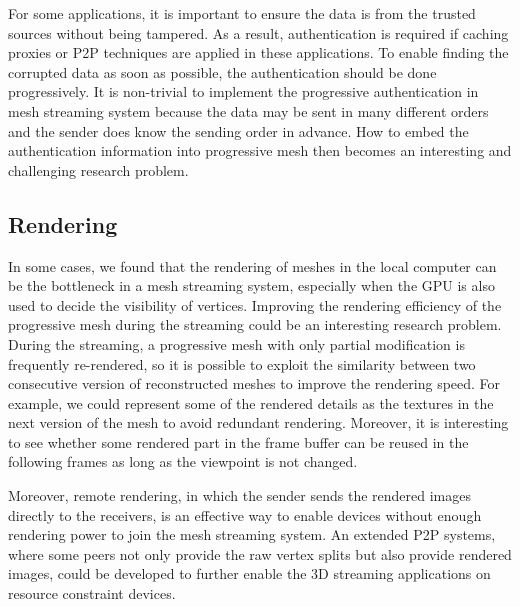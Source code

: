 For some applications, it is important to ensure the data is from the trusted sources without
being tampered. As a result, authentication is required if caching proxies or P2P techniques
are applied in these applications. 
To enable finding the corrupted data as soon as possible, the authentication should be
done progressively. It is non-trivial to implement the progressive authentication in mesh
streaming system because the data may be sent in many different orders 
and the sender does know the sending order in advance.
How to embed the authentication information into progressive mesh then becomes
an interesting and challenging research problem.
%
\subsection{Rendering}
In some cases, we found that the rendering of meshes in the local 
computer can be the bottleneck in a mesh streaming system, 
especially when the GPU is also used to decide the visibility of vertices. 
Improving the rendering efficiency of the progressive mesh during the streaming 
could be an interesting research problem.  
During the streaming, a progressive mesh with only partial modification is frequently re-rendered, 
so it is possible to exploit the similarity between two consecutive version of reconstructed meshes
to improve the rendering speed.
For example, we could represent some of the rendered details as the textures in the next version of
the mesh to avoid redundant rendering.
Moreover, it is interesting to see whether some rendered part in the frame buffer can be 
reused in the following frames as long as the viewpoint is not changed.

Moreover, remote rendering, in which the sender sends the rendered images directly to the receivers, 
is an effective way to enable devices without enough rendering power to 
join the mesh streaming system. An extended P2P systems, where some peers not only provide the raw vertex splits
but also provide rendered images, could be developed to further enable the 3D streaming applications on resource
constraint devices.

